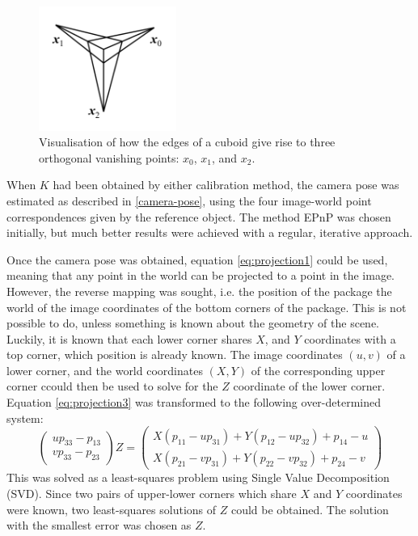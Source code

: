 \begin{figure}
\begin{center}
\includegraphics[width=0.4\textwidth]{figures/vanishing_points.png}
\end{center}
\caption{Visualisation of how the edges of a cuboid give rise to three orthogonal vanishing points: $x_0$, $x_1$, and $x_2$.} %
\label{fig:vanishing_points}
\end{figure}

When $K$ had been obtained by either calibration method, the camera pose was estimated as described in \ref{camera-pose}, using the four image-world point correspondences given by the reference object.
The method EPnP was chosen initially, but much better results were achieved with a regular, iterative approach.

Once the camera pose was obtained, equation \ref{eq:projection1} could be used, meaning that any point in the world can be projected to a point in the image.
However, the reverse mapping was sought, i.e. the position of the package the world of the image coordinates of the bottom corners of the package.
This is not possible to do, unless something is known about the geometry of the scene.
Luckily, it is known that each lower corner shares $X$, and $Y$ coordinates with a top corner, which position is already known.
The image coordinates $(u,v)$ of a lower corner, and the world coordinates $(X,Y)$ of the corresponding upper corner ccould then be used to solve for the $Z$ coordinate of the lower corner. 
Equation \ref{eq:projection3} was transformed to the following over-determined system:
\begin{equation} \label{eq:constrained-projection}
\begin{pmatrix} up_{33}-p_{13} \\ vp_{33}-p_{23} \end{pmatrix} Z = 
\begin{pmatrix}
X(p_{11}-up_{31}) + Y(p_{12}-up_{32})+p_{14}-u \\
X(p_{21}-vp_{31}) + Y(p_{22}-vp_{32})+p_{24}-v
\end{pmatrix}
\end{equation}
This was solved as a least-squares problem using Single Value Decomposition (SVD).
Since two pairs of upper-lower corners which share $X$ and $Y$ coordinates were known, two least-squares solutions of $Z$ could be obtained.
The solution with the smallest error was chosen as $Z$.

